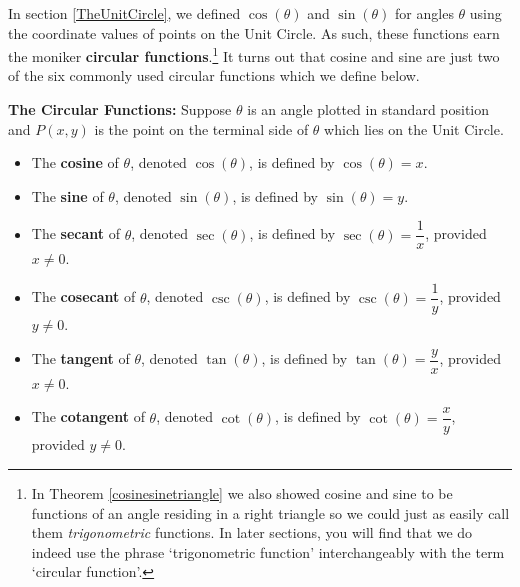 

\setcounter{footnote}{0}

\label{CircularFunctions}

In section \ref{TheUnitCircle},  we defined $\cos(\theta)$ and $\sin(\theta)$  for angles $\theta$ using the coordinate values of points on the Unit Circle.  As such, these functions earn the moniker \textbf{circular functions}.\footnote{In Theorem \ref{cosinesinetriangle} we also showed cosine and sine to be functions of an angle residing in a right triangle so we could just as easily call them \emph{trigonometric} functions.  In later sections, you will find that we do indeed use the phrase `trigonometric function' interchangeably with the term `circular function'.} It turns out that cosine and sine are just two of the six commonly used circular functions which we define below. 

\enlargethispage{.2in}


\colorbox{ResultColor}{\bbm

\begin{defn} \label{circularfunctions}  \textbf{The Circular Functions:} Suppose $\theta$ is an angle plotted in standard position and $P(x,y)$ is the point on the terminal side of $\theta$ which lies on the Unit Circle.  

\begin{itemize}

\item The  \textbf{cosine} of $\theta$, denoted $\cos(\theta)$, is defined by $\cos(\theta) = x$.

\item The  \textbf{sine} of $\theta$, denoted $\sin(\theta)$, is defined by $\sin(\theta) = y$.

\item The  \textbf{secant} of $\theta$, denoted $\sec(\theta)$, is defined by $\sec(\theta) = \dfrac{1}{x}$, provided $x \neq 0$.

\item The  \textbf{cosecant} of $\theta$, denoted $\csc(\theta)$, is defined by $\csc(\theta) = \dfrac{1}{y}$, provided $y \neq 0$.

\item The  \textbf{tangent} of $\theta$, denoted $\tan(\theta)$, is defined by $\tan(\theta) = \dfrac{y}{x}$, provided $x \neq 0$.

\item The  \textbf{cotangent} of $\theta$, denoted $\cot(\theta)$, is defined by $\cot(\theta) = \dfrac{x}{y}$, provided $y \neq 0$.

\end{itemize}

\end{defn}

\ebm}

